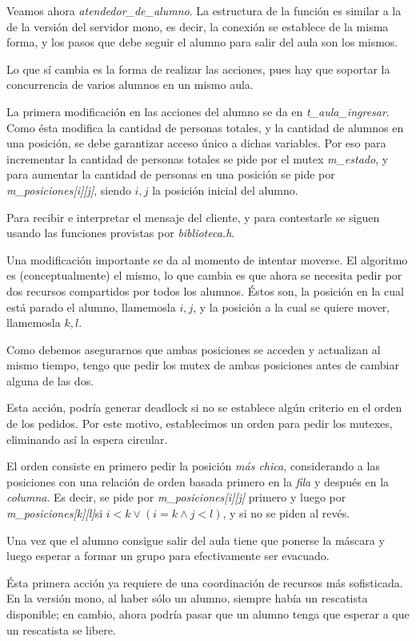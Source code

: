 \documentclass[a4paper]{article}
\begin{document}
Veamos ahora \textit{atendedor\_de\_alumno}. La estructura de la función es
similar a la de la versión del servidor mono, es decir, la conexión se
establece de la misma forma, y los pasos que debe seguir el alumno para
salir del aula son los mismos.

Lo que sí cambia es la forma de realizar las acciones, pues hay que soportar
la concurrencia de varios alumnos en un mismo aula.

La primera modificación en las acciones del alumno se da en
\textit{t\_aula\_ingresar}. Como ésta modifica la cantidad de personas
totales, y la cantidad de alumnos en una posición, se debe garantizar acceso
único a dichas variables. Por eso para incrementar la cantidad de personas
totales se pide por el mutex \textit{m\_estado}, y para aumentar la cantidad
de personas en una posición se pide por \textit{m\_posiciones[i][j]}, siendo
$i,j$ la posición inicial del alumno.

Para recibir e interpretar el mensaje del cliente, y para contestarle se siguen usando las funciones provistas por \textit{biblioteca.h}.

Una modificación importante se da al momento de intentar moverse. El
algoritmo es (conceptualmente) el mismo, lo que cambia es que ahora se
necesita pedir por dos recursos compartidos por todos los alumnos. Éstos
son, la posición en la cual está parado el alumno, llamemosla $i,j$, y la
posición a la cual se quiere mover, llamemosla $k,l$.

Como debemos asegurarnos que ambas posiciones se acceden y actualizan al
mismo tiempo, tengo que pedir los mutex de ambas posiciones antes de cambiar
alguna de las dos.

Esta acción, podría generar deadlock si no se establece algún criterio en el
orden de los pedidos. Por este motivo, establecimos un orden para pedir los
mutexes, eliminando así la espera circular.

El orden consiste en primero pedir la posición \textit{más chica},
considerando a las posiciones con una relación de orden basada primero en la
\textit{fila} y después en la \textit{columna}. Es decir, se pide por
\textit{m\_posiciones[i][j]} primero y luego por
\textit{m\_posiciones[k][l]}si $i < k \vee (i = k \wedge j < l)$, y si no se
piden al revés.

Una vez que el alumno consigue salir del aula tiene que ponerse la máscara y
luego esperar a formar un grupo para efectivamente ser evacuado.

Ésta primera acción ya requiere de una coordinación de recursos más
sofisticada. En la versión mono, al haber sólo un alumno, siempre había un
rescatista disponible; en cambio, ahora podría pasar que un  alumno tenga
que esperar a que un rescatista se libere.
\end{document}
